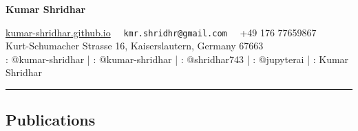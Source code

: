 \documentclass[10pt,letterpaper]{article}
\begin{document}
\begin{center}
{\LARGE \color{MidnightBlue} \textbf{Kumar Shridhar}}

\url{ kumar-shridhar.github.io} \textbullet
\ \ \texttt{kmr.shridhr@gmail.com} \textbullet
\ \ +49 176 77659867
\\
Kurt-Schumacher Strasse 16, Kaiserslautern, Germany  67663 \\
\faGithub: @kumar-shridhar | \faLinkedin: @kumar-shridhar | \faMedium: @shridhar743 | \faTwitter: @jupyterai | \faGraduationCap: Kumar Shridhar
\end{center}


\hrule
\vspace{-0.4em}
\subsection*{\color{MidnightBlue}Publications}
\end{document}
